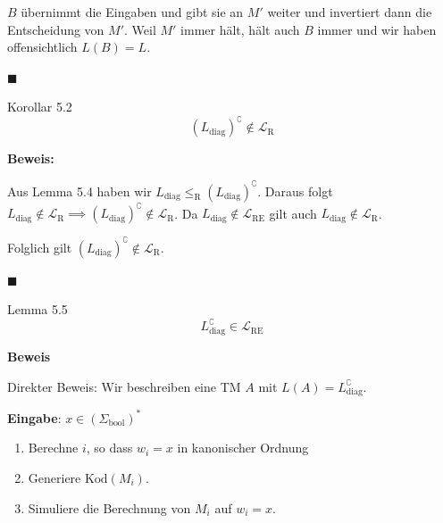 \documentclass[a4paper, 11pt]{article}
\def\L{\mathcal{L}}
\def\Lre{\mathcal{L}_\text{RE}}
\def\Lr{\mathcal{L}_\text{R}}
\begin{document}
                $B$ übernimmt die Eingaben und gibt sie an $M'$ weiter und invertiert dann die Entscheidung von $M'$. Weil $M'$ immer hält, hält auch $B$ immer und wir haben offensichtlich $L(B) = L$.
            
                \hspace*{0pt}\hfill$\blacksquare$
            
                
                \begin{subbox}{Korollar 5.2}
                    $$(L_\text{diag})^\complement \notin \L_\text{R}$$
                \end{subbox}
                
                \textbf{Beweis:} 
                
                Aus Lemma 5.4 haben wir $L_\text{diag} \leq_\text{R} (L_\text{diag})^\complement$. Daraus folgt $L_\text{diag} \notin \Lr \implies (L_\text{diag})^\complement \notin \Lr$.
                Da $L_\text{diag} \notin \Lre$ gilt auch $L_\text{diag} \notin \Lr$. 
                
                Folglich gilt $(L_\text{diag})^\complement \notin \Lr$.
            
                \hspace*{0pt}\hfill$\blacksquare$
            
            
            
              

                \begin{mainbox}{Lemma 5.5}
                    $$L_{\text{diag}}^{\complement} \in \Lre$$
                \end{mainbox}
                \textbf{Beweis}
                    
                
                    Direkter Beweis: Wir beschreiben eine TM $A$ mit $L(A) = L_{\text{diag}}^\complement$.
                    
                    \textbf{Eingabe}: $x \in (\Sigma_{\text{bool}})^*$
                    
                    \begin{enumerate}[label=(\roman*)]
                        \item Berechne $i$, so dass $w_i = x$ in kanonischer Ordnung
                        \item Generiere $\text{Kod}(M_i)$.
                        \item Simuliere die Berechnung von $M_i$ auf $w_i = x$. 
                    \end{enumerate}
                   
\end{document}

